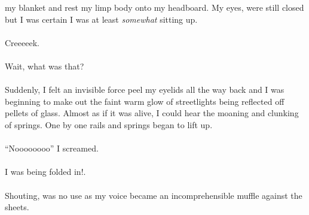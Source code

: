 \documentclass{book}
\begin{document}
{{	my blanket and rest my limp body
	onto my headboard.
	My eyes, were still closed but I was certain I was at least
	\textit{somewhat} sitting up.\\\\
	Creeeeek.\\\\
	Wait, what was that?\\\\
	Suddenly, I felt an invisible force peel my eyelids all the way
	back and I was beginning to make out the faint warm glow
	of streetlights being reflected off pellets of glass.
	Almost as if it was alive, I could hear the moaning and
	clunking of springs. One by one
	rails and springs began to lift up.\\\\
	``Noooooooo'' I screamed.\\\\
	I was being folded in!.\\\\
	Shouting, was no use as my voice became an incomprehensible muffle
against the sheets.}}\\\\
\end{document}

